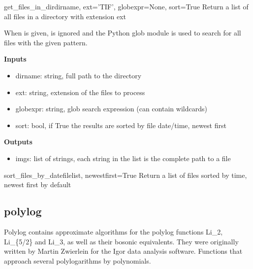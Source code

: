 \documentclass[letterpaper,10pt,english]{manual}
\begin{document}
\hypertarget{odysseus.filetools.get_files_in_dir}{}\begin{funcdesc}{get\_files\_in\_dir}{dirname, ext='TIF', globexpr=None, sort=True}
Return a list of all files in a directory with extension ext

When  is given,  is ignored and the Python glob module
is used to search for all files with the given pattern.

\textbf{Inputs}
\begin{itemize}
\item {} 
dirname: string, full path to the directory

\item {} 
ext: string, extension of the files to process

\item {} 
globexpr: string, glob search expression (can contain wildcards)

\item {} 
sort: bool, if True the results are sorted by file date/time, newest
first

\end{itemize}

\textbf{Outputs}
\begin{itemize}
\item {} 
imgs: list of strings, each string in the list is the complete path to
a file

\end{itemize}
\end{funcdesc}

\hypertarget{odysseus.filetools.sort_files_by_date}{}\begin{funcdesc}{sort\_files\_by\_date}{filelist, newestfirst=True}
Return a list of files sorted by time, newest first by default
\end{funcdesc}


\subsection{polylog}

Polylog contains approximate algorithms for the polylog functions Li\_2, Li\_\{5/2\} and Li\_3, as well as their bosonic equivalents. They were originally written by Martin Zwierlein for the Igor data analysis software.
\hypertarget{module-odysseus.polylog}{}
\modulesynopsis{}
Functions that approach several polylogarithms by polynomials.
\end{document}
